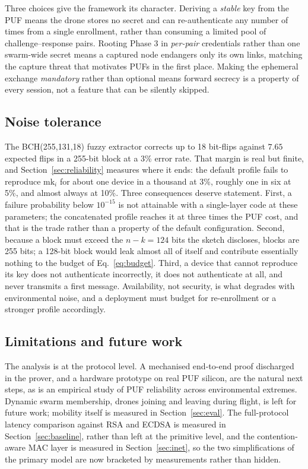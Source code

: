 \documentclass[journal]{IEEEtran}
\begin{document}
Three choices give the framework its character. Deriving a \emph{stable} key
from the PUF means the drone stores no secret and can re-authenticate any
number of times from a single enrollment, rather than consuming a limited pool
of challenge--response pairs. Rooting Phase 3 in \emph{per-pair} credentials
rather than one swarm-wide secret means a captured node endangers only its own
links, matching the capture threat that motivates PUFs in the first place.
Making the ephemeral exchange \emph{mandatory} rather than optional means
forward secrecy is a property of every session, not a feature that can be
silently skipped.

\subsection{Noise tolerance}

The BCH(255,131,18) fuzzy extractor corrects up to 18 bit-flips against $7.65$
expected flips in a 255-bit block at a 3\% error rate. That margin is real but
finite, and Section~\ref{sec:reliability} measures where it ends: the default
profile fails to reproduce $\text{mk}_i$ for about one device in a thousand at
3\%, roughly one in six at 5\%, and almost always at 10\%. Three consequences
deserve statement. First, a failure probability below $10^{-15}$ is not
attainable with a single-layer code at these parameters; the concatenated
profile reaches it at three times the PUF cost, and that is the trade rather
than a property of the default configuration. Second, because a block must
exceed the $n-k = 124$ bits the sketch discloses, blocks are 255 bits; a
128-bit block would leak almost all of itself and contribute essentially
nothing to the budget of Eq.~\eqref{eq:budget}. Third, a device that cannot
reproduce its key does not authenticate incorrectly, it does not authenticate
at all, and never transmits a first message. Availability, not security, is
what degrades with environmental noise, and a deployment must budget for
re-enrollment or a stronger profile accordingly.

\subsection{Limitations and future work}

The analysis is at the protocol level. A mechanised end-to-end proof discharged
in the prover, and a hardware prototype on real PUF silicon, are the natural
next steps, as is an empirical study of PUF reliability across environmental
extremes. Dynamic swarm membership, drones joining and leaving during flight,
is left for future work; mobility itself is measured in
Section~\ref{sec:eval}. The full-protocol latency comparison against RSA and
ECDSA is measured in Section~\ref{sec:baseline}, rather than left at the
primitive level, and the contention-aware MAC layer is measured in
Section~\ref{sec:inet}, so the two simplifications of the primary model are now
bracketed by measurements rather than hidden.
\end{document}

